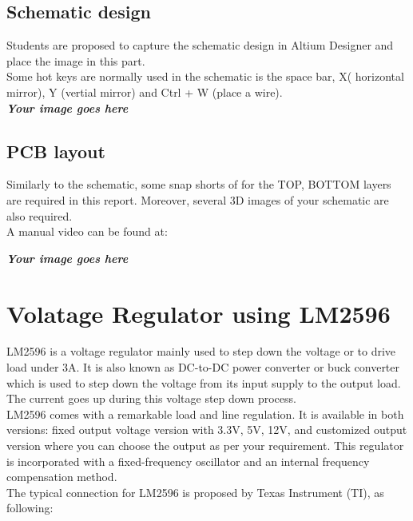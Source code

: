 \subsection{Schematic design}
Students are proposed to capture the schematic design in Altium Designer and place the image in this part.\\

Some hot keys are normally used in the schematic is the space bar, X( horizontal mirror), Y (vertial mirror) and Ctrl + W (place a wire).\\

\textbf{\textit{Your image goes here}}

\subsection{PCB layout}
Similarly to the schematic, some snap shorts of for the TOP, BOTTOM layers are required in this report. Moreover, several 3D images of your schematic are also required.\\

A manual video can be found at:
\begin{center}
\end{center}

\textbf{\textit{Your image goes here}}


\section{Volatage Regulator using LM2596}

LM2596 is a voltage regulator mainly used to step down the voltage or to drive load under 3A. It is also known as DC-to-DC power converter or buck converter which is used to step down the voltage from its input supply to the output load. The current goes up during this voltage step down process.\\


LM2596 comes with a remarkable load and line regulation. It is available in both versions: fixed output voltage version with 3.3V, 5V, 12V, and customized output version where you can choose the output as per your requirement. This regulator is incorporated with a fixed-frequency oscillator and an internal frequency compensation method.\\

The typical connection for LM2596 is proposed by Texas Instrument (TI), as following:

